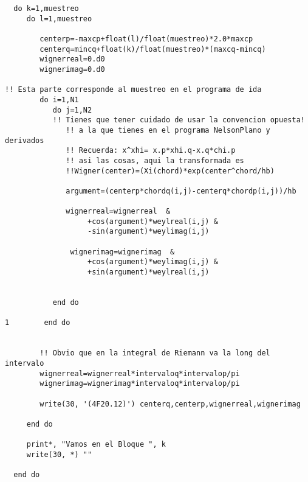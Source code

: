 \documentclass[a4paper,12pt]{article}
\begin{document}
\begin{verbatim}
  do k=1,muestreo
     do l=1,muestreo

        centerp=-maxcp+float(l)/float(muestreo)*2.0*maxcp
        centerq=mincq+float(k)/float(muestreo)*(maxcq-mincq)
        wignerreal=0.d0
        wignerimag=0.d0

!! Esta parte corresponde al muestreo en el programa de ida
        do i=1,N1
           do j=1,N2
           !! Tienes que tener cuidado de usar la convencion opuesta!
              !! a la que tienes en el programa NelsonPlano y derivados
              !! Recuerda: x^xhi= x.p*xhi.q-x.q*chi.p
              !! asi las cosas, aqui la transformada es 
              !!Wigner(center)=(Xi(chord)*exp(center^chord/hb)

              argument=(centerp*chordq(i,j)-centerq*chordp(i,j))/hb 
                           
              wignerreal=wignerreal  &
                   +cos(argument)*weylreal(i,j) &
                   -sin(argument)*weylimag(i,j)
              
               wignerimag=wignerimag  &
                   +cos(argument)*weylimag(i,j) &
                   +sin(argument)*weylreal(i,j)

              
           end do
           
1        end do
        

        !! Obvio que en la integral de Riemann va la long del intervalo
        wignerreal=wignerreal*intervaloq*intervalop/pi
        wignerimag=wignerimag*intervaloq*intervalop/pi
 
        write(30, '(4F20.12)') centerq,centerp,wignerreal,wignerimag
        
     end do
     
     print*, "Vamos en el Bloque ", k
     write(30, *) ""

  end do

\end{verbatim}
  
\end{document}
